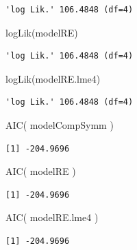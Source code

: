 \documentclass[
  letterpaper,
  DIV=11,
  numbers=noendperiod]{scrreprt}
\newenvironment{Shaded}{}{}
\newcommand{\FunctionTok}[1]{\textcolor[rgb]{0.02,0.16,0.49}{#1}}
\newcommand{\NormalTok}[1]{#1}
\begin{document}
\begin{verbatim}
'log Lik.' 106.4848 (df=4)
\end{verbatim}

\begin{Shaded}
\begin{Highlighting}[]
\FunctionTok{logLik}\NormalTok{(modelRE)}
\end{Highlighting}
\end{Shaded}

\begin{verbatim}
'log Lik.' 106.4848 (df=4)
\end{verbatim}

\begin{Shaded}
\begin{Highlighting}[]
\FunctionTok{logLik}\NormalTok{(modelRE.lme4)}
\end{Highlighting}
\end{Shaded}

\begin{verbatim}
'log Lik.' 106.4848 (df=4)
\end{verbatim}

\begin{Shaded}
\begin{Highlighting}[]
\FunctionTok{AIC}\NormalTok{( modelCompSymm )}
\end{Highlighting}
\end{Shaded}

\begin{verbatim}
[1] -204.9696
\end{verbatim}

\begin{Shaded}
\begin{Highlighting}[]
\FunctionTok{AIC}\NormalTok{( modelRE )}
\end{Highlighting}
\end{Shaded}

\begin{verbatim}
[1] -204.9696
\end{verbatim}

\begin{Shaded}
\begin{Highlighting}[]
\FunctionTok{AIC}\NormalTok{( modelRE.lme4 )}
\end{Highlighting}
\end{Shaded}

\begin{verbatim}
[1] -204.9696
\end{verbatim}
\end{document}
